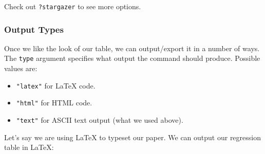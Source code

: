\documentclass[]{book}
\providecommand{\tightlist}{%
  \setlength{\itemsep}{0pt}\setlength{\parskip}{0pt}}
\begin{document}
Check out \texttt{?stargazer} to see more options.

\subsubsection*{Output Types}\label{output-types}

Once we like the look of our table, we can output/export it in a number
of ways. The \texttt{type} argument specifies what output the command
should produce. Possible values are:

\begin{itemize}
\tightlist
\item
  \texttt{"latex"} for LaTeX code.
\item
  \texttt{"html"} for HTML code.
\item
  \texttt{"text"} for ASCII text output (what we used above).
\end{itemize}

Let's say we are using LaTeX to typeset our paper. We can output our
regression table in LaTeX:
\end{document}
